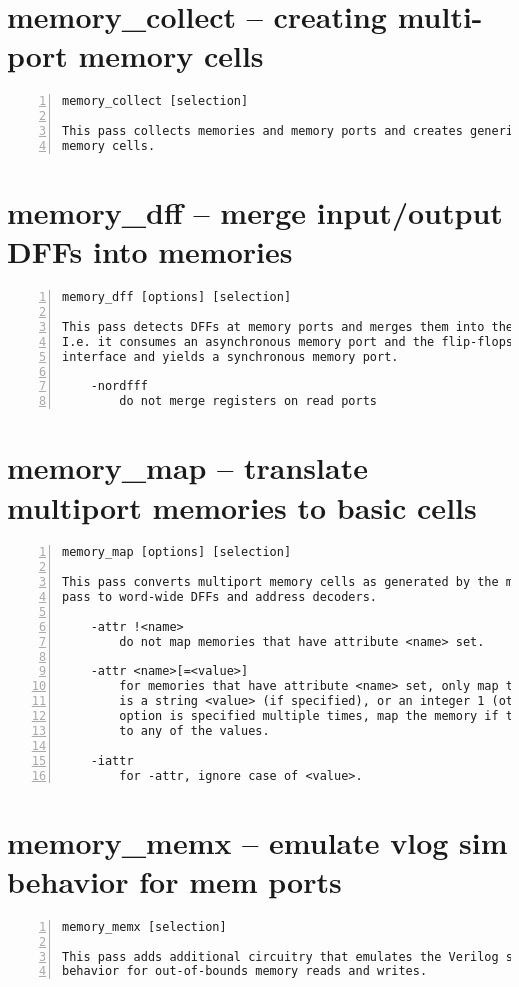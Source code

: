 \section{memory\_collect -- creating multi-port memory cells}
\label{cmd:memory_collect}
\begin{lstlisting}[numbers=left,frame=single]
    memory_collect [selection]

This pass collects memories and memory ports and creates generic multiport
memory cells.
\end{lstlisting}

\section{memory\_dff -- merge input/output DFFs into memories}
\label{cmd:memory_dff}
\begin{lstlisting}[numbers=left,frame=single]
    memory_dff [options] [selection]

This pass detects DFFs at memory ports and merges them into the memory port.
I.e. it consumes an asynchronous memory port and the flip-flops at its
interface and yields a synchronous memory port.

    -nordfff
        do not merge registers on read ports
\end{lstlisting}

\section{memory\_map -- translate multiport memories to basic cells}
\label{cmd:memory_map}
\begin{lstlisting}[numbers=left,frame=single]
    memory_map [options] [selection]

This pass converts multiport memory cells as generated by the memory_collect
pass to word-wide DFFs and address decoders.

    -attr !<name>
        do not map memories that have attribute <name> set.

    -attr <name>[=<value>]
        for memories that have attribute <name> set, only map them if its value
        is a string <value> (if specified), or an integer 1 (otherwise). if this
        option is specified multiple times, map the memory if the attribute is
        to any of the values.

    -iattr
        for -attr, ignore case of <value>.
\end{lstlisting}

\section{memory\_memx -- emulate vlog sim behavior for mem ports}
\label{cmd:memory_memx}
\begin{lstlisting}[numbers=left,frame=single]
    memory_memx [selection]

This pass adds additional circuitry that emulates the Verilog simulation
behavior for out-of-bounds memory reads and writes.
\end{lstlisting}

